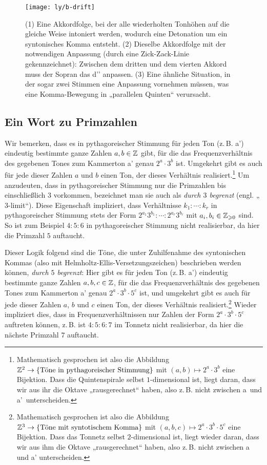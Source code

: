 \begin{figure}
  \centering
  \texttt{[image: ly/b-drift]}
  \caption{(1) Eine Akkordfolge, bei der alle wiederholten Tonhöhen auf die   
  	gleiche Weise intoniert werden, wodurch eine Detonation um ein syntonisches
  	Komma entsteht. %
  	(2) Dieselbe Akkordfolge mit der notwendigen Anpassung (durch eine
  	Zick-Zack-Linie gekennzeichnet): Zwischen dem dritten und dem vierten Akkord
  	muss der Sopran das d’’ anpassen. %
  	(3) Eine ähnliche Situation, in der sogar zwei Stimmen eine Anpassung
  	vornehmen müssen, was eine Komma-Bewegung in „parallelen Quinten“
  	verursacht.}\label{fig:drift}
\end{figure}

\subsection{Ein Wort zu Primzahlen}

Wir bemerken, dass es in pythagoreischer Stimmung für jeden Ton (z.\,B. \flat
a’) eindeutig bestimmte ganze Zahlen $a,b\in \mathbb{Z}$ gibt, für die das
Frequenzverhältnis des gegebenen Tones zum Kammerton a’ genau $2^a\cdot 3^b$
ist. Umgekehrt gibt es auch für jede dieser Zahlen $a$ und $b$ einen Ton, der
dieses Verhältnis realisiert.\footnote{Mathematisch gesprochen ist also die
  Abbildung $\mathbb{Z}^2\to \{\text{Töne in pythagoreischer Stimmung}\}$ mit
  $(a,b)\mapsto 2^a\cdot 3^b$ eine Bijektion. Dass die Quintenspirale selbst
  $1$-dimensional ist, liegt daran, dass wir aus ihr die Oktave „rausgerechnet“
  haben, also z.\,B. nicht zwischen \flat a\ und \flat a'\ unterscheiden.}  Um
anzudeuten, dass in pythagoreischer Stimmung nur die Primzahlen bis
einschließlich $3$ vorkommen, bezeichnet man sie auch als \emph{durch $3$
  begrenzt} (engl. „$3$-limit“).  Diese Eigenschaft impliziert, dass
Verhältnisse $k_1:\dotsb:k_r$ in pythagoreischer Stimmung stets der Form
$2^{a_1}3^{b_1}:\dotsb:2^{a_r}3^{b_r}$ mit $a_i,b_i\in\mathbb{Z}_{\geqslant 0}$ sind. So ist
zum Beispiel $4:5:6$ in pythagoreischer Stimmung nicht realisierbar, da hier die
Primzahl $5$ auftaucht.

Dieser Logik folgend sind die Töne, die unter Zuhilfenahme des syntonischen
Kommas (also mit Helmholtz-Ellis-Versetzungszeichen) beschrieben werden können,
\emph{durch $5$ begrenzt}: Hier gibt es für jeden Ton (z.\,B. \flatp a')
eindeutig bestimmte ganze Zahlen $a,b,c\in\mathbb{Z}$, für die das Frequenzverhältnis
des gegebenen Tones zum Kammerton a’ genau $2^a\cdot 3^b\cdot 5^c$ ist, und
umgekehrt gibt es auch für jede dieser Zahlen $a$, $b$ und $c$ einen Ton, der
dieses Verhältnis realisiert.\footnote{Mathematisch gesprochen ist also die
  Abbildung $\mathbb{Z}^3\to \{\text{Töne mit syntotischem Komma}\}$ mit
  $(a,b,c)\mapsto 2^a\cdot 3^b\cdot 5^c$ eine Bijektion. Dass das Tonnetz selbst
  $2$-dimensional ist, liegt wieder daran, dass wir aus ihm die Oktave
  „rausgerechnet“ haben, also z.\,B. nicht zwischen \flatp a und \flatp a’
  unterscheiden.} Wieder impliziert dies, dass in Frequenzverhältnissen nur
Zahlen der Form $2^a\cdot 3^b\cdot 5^c$ auftreten können, z.\,B. ist $4:5:6:7$ im Tonnetz
nicht realisierbar, da hier die nächste Primzahl $7$ auftaucht.

